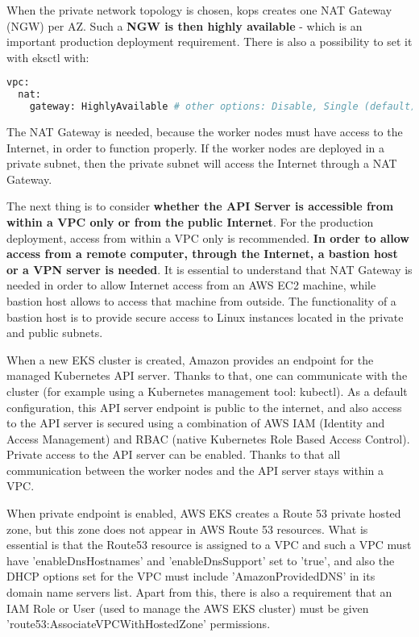
When the private network topology is chosen, kops creates one NAT Gateway (NGW) per AZ\cite{kops-net2}. Such a \textbf{NGW is then highly available} - which is an important production deployment requirement. There is also a possibility to set it with eksctl with\cite{eksctl-net}:
\begin{lstlisting}[basicstyle=\small,caption={YAML configuration used by eksctl to set NAT Gateway as Highly Available},captionpos=b,language=Bash,xleftmargin=1cm]
vpc:
  nat:
    gateway: HighlyAvailable # other options: Disable, Single (default)
\end{lstlisting}

The NAT Gateway is needed, because the worker nodes must have access to the Internet, in order to function properly. If the worker nodes are deployed in a private subnet, then the private subnet will access the Internet through a NAT Gateway\cite{eks-net}.


The next thing is to consider \textbf{whether the API Server is accessible from within a VPC only or from the public Internet}. For the production deployment, access from within a VPC only is recommended. \textbf{In order to allow access from a remote computer, through the Internet, a bastion host or a VPN server is needed}\cite{gruntwork-howto}. It is essential to understand that NAT Gateway is needed in order to allow Internet access from an AWS EC2 machine, while bastion host allows to access that machine from outside. The functionality of a bastion host is to provide secure access to Linux instances located in the private and public subnets\cite{aws-bastion}.

When a new EKS cluster is created, Amazon provides an endpoint for the managed Kubernetes API server. Thanks to that, one can communicate with the cluster (for example using a Kubernetes management tool: kubectl). As a default configuration, this API server endpoint is public to the internet, and also access to the API server is secured using a combination of AWS IAM (Identity and Access Management) and RBAC (native Kubernetes Role Based Access Control). Private access to the API server can be enabled. Thanks to that all communication between the worker nodes and the API server stays within a VPC\cite{eks-cluster-endpoint}.

When private endpoint is enabled, AWS EKS creates a Route 53 private hosted zone, but this zone does not appear in AWS Route 53 resources. What is essential is that the Route53 resource is assigned to a VPC and such a VPC must have 'enableDnsHostnames' and 'enableDnsSupport' set to 'true', and also the DHCP options set for the VPC must include 'AmazonProvidedDNS' in its domain name servers list. Apart from this, there is also a requirement that an IAM Role or User (used to manage the AWS EKS cluster) must be given 'route53:AssociateVPCWithHostedZone' permissions\cite{eks-cluster-endpoint}.

